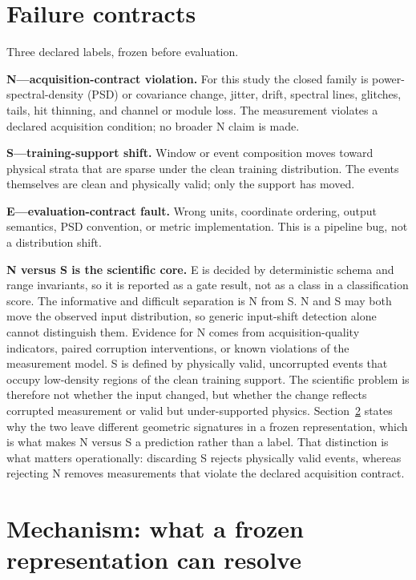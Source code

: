 \documentclass[10pt,twocolumn]{extarticle}
\begin{document}
\section{Failure contracts}

Three declared labels, frozen before evaluation.

\textbf{N---acquisition-contract violation.} For this study the closed family
is power-spectral-density (PSD) or covariance change, jitter, drift, spectral
lines, glitches, tails, hit thinning, and channel or module loss. The
measurement violates a declared acquisition condition; no broader N claim is
made.

\textbf{S---training-support shift.} Window or event composition moves toward
physical strata that are sparse under the clean training distribution. The
events themselves are clean and physically valid; only the support has moved.

\textbf{E---evaluation-contract fault.} Wrong units, coordinate ordering,
output semantics, PSD convention, or metric implementation. This is a pipeline
bug, not a distribution shift.

\textbf{N versus S is the scientific core.} E is decided by deterministic
schema and range invariants, so it is reported as a gate result, not as a class
in a classification score. The informative and difficult separation is N from
S. N and S may both move the observed input distribution, so generic
input-shift detection alone cannot distinguish them. Evidence for N comes from
acquisition-quality indicators, paired corruption interventions, or known
violations of the measurement model. S is defined by physically valid,
uncorrupted events that occupy low-density regions of the clean training
support. The scientific problem is therefore not whether the input changed, but
whether the change reflects corrupted measurement or valid but under-supported
physics. Section~\ref{sec:mechanism} states why the two leave different
geometric signatures in a frozen representation, which is what makes N versus
S a prediction rather than a label. That distinction is what matters operationally: discarding S rejects
physically valid events, whereas rejecting N removes measurements that violate
the declared acquisition contract.

\section{Mechanism: what a frozen representation can resolve}
\label{sec:mechanism}
\end{document}
